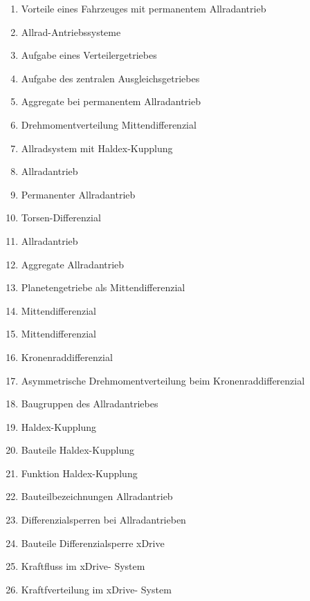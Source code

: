 \begin{enumerate}
\item
  Vorteile eines Fahrzeuges mit permanentem Allradantrieb\\
\item
  Allrad-Antriebssysteme\\
\item
  Aufgabe eines Verteilergetriebes\\
\item
  Aufgabe des zentralen Ausgleichsgetriebes\\
\item
  Aggregate bei permanentem Allradantrieb\\
\item
  Drehmomentverteilung Mittendifferenzial\\
\item
  Allradsystem mit Haldex-Kupplung\\
\item
  Allradantrieb\\
\item
  Permanenter Allradantrieb\\
\item
  Torsen-Differenzial\\
\item
  Allradantrieb\\
\item
  Aggregate Allradantrieb\\
\item
  Planetengetriebe als Mittendifferenzial\\
\item
  Mittendifferenzial\\
\item
  Mittendifferenzial\\
\item
  Kronenraddifferenzial\\
\item
  Asymmetrische Drehmomentverteilung beim Kronenraddifferenzial\\
\item
  Baugruppen des Allradantriebes\\
\item
  Haldex-Kupplung\\
\item
  Bauteile Haldex-Kupplung\\
\item
  Funktion Haldex-Kupplung\\
\item
  Bauteilbezeichnungen Allradantrieb\\
\item
  Differenzialsperren bei Allradantrieben\\
\item
  Bauteile Differenzialsperre xDrive\\
\item
  Kraftfluss im xDrive- System\\
\item
  Kraftfverteilung im xDrive- System
\end{enumerate}

